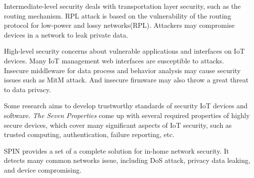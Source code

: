 Intermediate-level security deals with transportation layer security, such as the routing mechanism. 
RPL attack is based on the vulnerability of the routing protocol for low-power and lossy networks(RPL)\cite{dvir2011vera}. 
Attackers may compromise devices in a network to leak private data.

High-level security concerns about vulnerable applications and interfaces on IoT devices. 
Many IoT management web interfaces are susceptible to attacks\cite{owasp2016url}. 
Insecure middleware for data process and behavior analysis may cause security issues such as MitM attack\cite{conzon2012virtus,levy2015ownership}. 
And insecure firmware may also throw a great threat to data privacy\cite{owasp2016url}.

Some research aims to develop trustworthy standards of security IoT devices and software. 
\textit{The Seven Properties}\cite{hunt2017the} come up with several required properties of highly secure devices, which cover many significant aspects of IoT security, such as trusted computing, authentication, failure reporting, etc.

SPIN\cite{hesselman2017spin} provides a set of a complete solution for in-home network security. 
It detects many common networks issue, including DoS attack, privacy data leaking, and device compromising.

